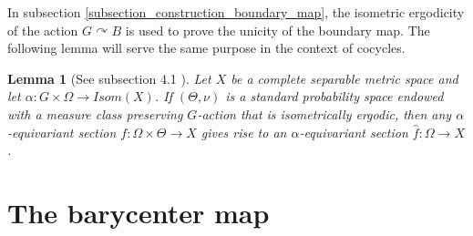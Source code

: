 \documentclass{amsart}
\numberwithin{equation}{section}
\newtheorem{lem}[thm]{Lemma}
\theoremstyle{definition}
\begin{document}
In subsection \ref{subsection_construction_boundary_map}, the isometric ergodicity of the action $G\curvearrowright B$ is used to prove the unicity of the boundary map. The following lemma will serve the same purpose in the context of cocycles.
\begin{lem}[See subsection 4.1 \cite{Guirardel-Horbez-Lecureux}]\label{lem_metric_ergodicity_cocycle}
    Let $X$ be a complete separable metric space and let $\alpha:G\times\Omega\rightarrow Isom(X)$. If $(\Theta ,\nu)$ is a standard probability space endowed with a measure class preserving $G$-action that is isometrically ergodic, then any $\alpha$-equivariant section $f:\Omega\times \Theta\rightarrow X$ gives rise to an $\alpha$-equivariant section $\hat{f}:\Omega\rightarrow X$.
\end{lem}




\section{The barycenter map}\label{section_barycenter_map}
\end{document}
